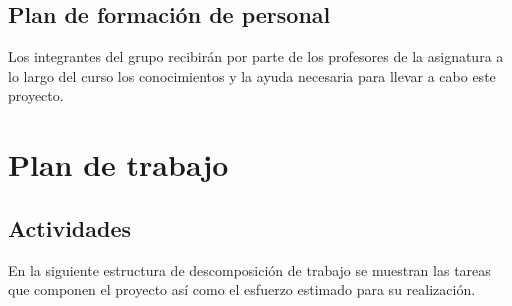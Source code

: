 \subsection{Plan de formación de personal}

Los integrantes del grupo recibirán por parte de los profesores de la
asignatura a lo largo del curso los conocimientos y la ayuda necesaria para
llevar a cabo este proyecto.

\section{Plan de trabajo}

\subsection{Actividades}

En la siguiente estructura de descomposición de trabajo se muestran las tareas
que componen el proyecto así como el esfuerzo estimado para su realización.

